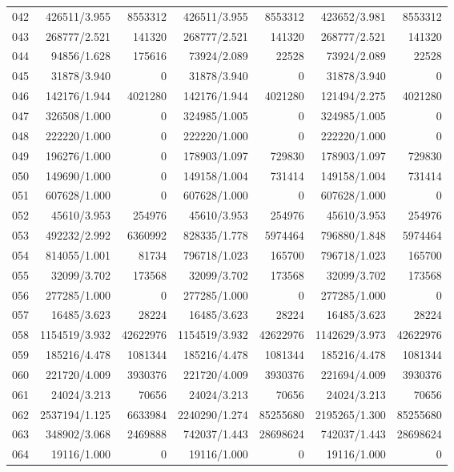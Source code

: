 \begin{longtable}{crrrrrr}
042 & 426511/3.955 & 8553312 & 426511/3.955 & 8553312 & 423652/3.981 & 8553312 \\
043 & 268777/2.521 & 141320 & 268777/2.521 & 141320 & 268777/2.521 & 141320 \\
044 & 94856/1.628 & 175616 & 73924/2.089 & 22528 & 73924/2.089 & 22528 \\
045 & 31878/3.940 & 0 & 31878/3.940 & 0 & 31878/3.940 & 0 \\
046 & 142176/1.944 & 4021280 & 142176/1.944 & 4021280 & 121494/2.275 & 4021280 \\
047 & 326508/1.000 & 0 & 324985/1.005 & 0 & 324985/1.005 & 0 \\
048 & 222220/1.000 & 0 & 222220/1.000 & 0 & 222220/1.000 & 0 \\
049 & 196276/1.000 & 0 & 178903/1.097 & 729830 & 178903/1.097 & 729830 \\
050 & 149690/1.000 & 0 & 149158/1.004 & 731414 & 149158/1.004 & 731414 \\
051 & 607628/1.000 & 0 & 607628/1.000 & 0 & 607628/1.000 & 0 \\
052 & 45610/3.953 & 254976 & 45610/3.953 & 254976 & 45610/3.953 & 254976 \\
053 & 492232/2.992 & 6360992 & 828335/1.778 & 5974464 & 796880/1.848 & 5974464 \\
054 & 814055/1.001 & 81734 & 796718/1.023 & 165700 & 796718/1.023 & 165700 \\
055 & 32099/3.702 & 173568 & 32099/3.702 & 173568 & 32099/3.702 & 173568 \\
056 & 277285/1.000 & 0 & 277285/1.000 & 0 & 277285/1.000 & 0 \\
057 & 16485/3.623 & 28224 & 16485/3.623 & 28224 & 16485/3.623 & 28224 \\
058 & 1154519/3.932 & 42622976 & 1154519/3.932 & 42622976 & 1142629/3.973 & 42622976 \\
059 & 185216/4.478 & 1081344 & 185216/4.478 & 1081344 & 185216/4.478 & 1081344 \\
060 & 221720/4.009 & 3930376 & 221720/4.009 & 3930376 & 221694/4.009 & 3930376 \\
061 & 24024/3.213 & 70656 & 24024/3.213 & 70656 & 24024/3.213 & 70656 \\
062 & 2537194/1.125 & 6633984 & 2240290/1.274 & 85255680 & 2195265/1.300 & 85255680 \\
063 & 348902/3.068 & 2469888 & 742037/1.443 & 28698624 & 742037/1.443 & 28698624 \\
064 & 19116/1.000 & 0 & 19116/1.000 & 0 & 19116/1.000 & 0 \\

\end{longtable}
